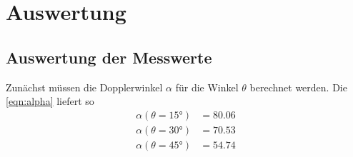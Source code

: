 \section{Auswertung}
\label{sec:Auswertung}


\subsection{Auswertung der Messwerte}
Zunächst müssen die Dopplerwinkel $\alpha$ für die Winkel $\theta$ berechnet werden.
Die \autoref{eqn:alpha} liefert so 
\begin{align*}
     \alpha(\theta =15°) &= 80.06\\
     \alpha(\theta =30°) &=70.53\\
     \alpha(\theta =45°) &=54.74\\
\end{align*}
